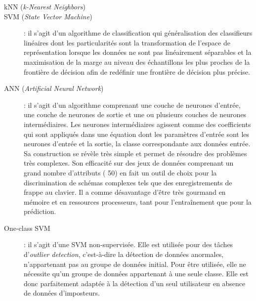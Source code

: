 \begin{description}
  \item[kNN\cite{Hu2008} (\textit{k-Nearest Neighbors})]
  \item[SVM\cite{giotSVM} (\textit{State Vector Machine})] : il s'agit d'un algorithme de classification qui généralisation des classifieurs linéaires dont les particularités sont la transformation de l'espace de représentation lorsque les données ne sont pas linéairement séparables et la maximisation de la marge au niveau des échantillons les plus proches de la frontière de décision afin de redéfinir une frontière de décision plus précise.
  \item[ANN (\textit{Artificial Neural Network})] : il s'agit d'un algorithme comprenant une couche de neurones d'entrée, une couche de neurones de sortie et une ou plusieurs couches de neurones intermédiaires. Les neurones intermédiaires agissent comme des coefficients qui sont appliqués dans une équation dont les paramètres d'entrée sont les neurones d'entrée et la sortie, la classe correspondante aux données entrée. Sa construction se révèle très simple et permet de résoudre des problèmes très complexes. Son efficacité sur des jeux de données comprenant un grand nombre d'attributs ( 50) en fait un outil de choix pour la discrimination de schémas complexes tels que des enregistrements de frappe au clavier. Il a comme désavantage d'être très gourmand en mémoire et en ressources processeurs, tant pour l'entraînement que pour la prédiction.
  \item[One-class SVM\cite{oneclassSVM}] : il s'agit d'une SVM non-supervisée. Elle est utilisée pour des tâches d'\textit{outlier detection}, c'est-à-dire la détection de données anormales, n'appartenant pas au groupe de données initial. Pour être utilisée, elle ne nécessite qu'un groupe de données appartenant à une seule classe. Elle est donc parfaitement adaptée à la détection d'un seul utilisateur en absence de données d'imposteurs.
\end{description}




